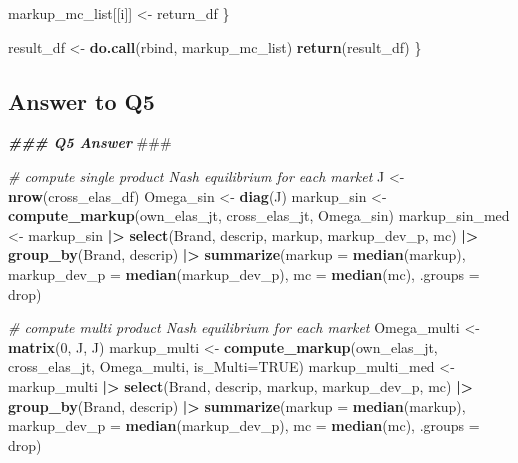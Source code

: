 \documentclass[
]{article}
\newenvironment{Shaded}{\begin{snugshade}}{\end{snugshade}}
\newcommand{\AlertTok}[1]{\textcolor[rgb]{0.94,0.16,0.16}{#1}}
\newcommand{\AttributeTok}[1]{\textcolor[rgb]{0.13,0.29,0.53}{#1}}
\newcommand{\CommentTok}[1]{\textcolor[rgb]{0.56,0.35,0.01}{\textit{#1}}}
\newcommand{\ConstantTok}[1]{\textcolor[rgb]{0.56,0.35,0.01}{#1}}
\newcommand{\DecValTok}[1]{\textcolor[rgb]{0.00,0.00,0.81}{#1}}
\newcommand{\DocumentationTok}[1]{\textcolor[rgb]{0.56,0.35,0.01}{\textbf{\textit{#1}}}}
\newcommand{\FunctionTok}[1]{\textcolor[rgb]{0.13,0.29,0.53}{\textbf{#1}}}
\newcommand{\NormalTok}[1]{#1}
\newcommand{\OtherTok}[1]{\textcolor[rgb]{0.56,0.35,0.01}{#1}}
\newcommand{\SpecialCharTok}[1]{\textcolor[rgb]{0.81,0.36,0.00}{\textbf{#1}}}
\newcommand{\StringTok}[1]{\textcolor[rgb]{0.31,0.60,0.02}{#1}}
\begin{document}
\begin{Shaded}
\begin{Highlighting}[]
\NormalTok{    markup\_mc\_list[[i]] }\OtherTok{\textless{}{-}}\NormalTok{ return\_df}
\NormalTok{  \}}
  
\NormalTok{  result\_df }\OtherTok{\textless{}{-}} \FunctionTok{do.call}\NormalTok{(rbind, markup\_mc\_list)}
  \FunctionTok{return}\NormalTok{(result\_df)}
\NormalTok{\} }
\end{Highlighting}
\end{Shaded}

\hypertarget{answer-to-q5}{%
\subsection{Answer to Q5}\label{answer-to-q5}}

\begin{Shaded}
\begin{Highlighting}[]
\DocumentationTok{\#\#\# Q5 Answer }\AlertTok{\#\#\#}

\CommentTok{\# compute single product Nash equilibrium for each market}
\NormalTok{J }\OtherTok{\textless{}{-}} \FunctionTok{nrow}\NormalTok{(cross\_elas\_df)}
\NormalTok{Omega\_sin }\OtherTok{\textless{}{-}} \FunctionTok{diag}\NormalTok{(J)}
\NormalTok{markup\_sin }\OtherTok{\textless{}{-}} \FunctionTok{compute\_markup}\NormalTok{(own\_elas\_jt, cross\_elas\_jt, Omega\_sin)}
\NormalTok{markup\_sin\_med }\OtherTok{\textless{}{-}}\NormalTok{ markup\_sin }\SpecialCharTok{|\textgreater{}}
  \FunctionTok{select}\NormalTok{(Brand, descrip, markup, markup\_dev\_p, mc) }\SpecialCharTok{|\textgreater{}}
  \FunctionTok{group\_by}\NormalTok{(Brand, descrip) }\SpecialCharTok{|\textgreater{}}
  \FunctionTok{summarize}\NormalTok{(}\AttributeTok{markup =} \FunctionTok{median}\NormalTok{(markup), }\AttributeTok{markup\_dev\_p =} \FunctionTok{median}\NormalTok{(markup\_dev\_p), }
            \AttributeTok{mc =} \FunctionTok{median}\NormalTok{(mc), }\AttributeTok{.groups =} \StringTok{\textquotesingle{}drop\textquotesingle{}}\NormalTok{)}

\CommentTok{\# compute multi product Nash equilibrium for each market}
\NormalTok{Omega\_multi }\OtherTok{\textless{}{-}} \FunctionTok{matrix}\NormalTok{(}\DecValTok{0}\NormalTok{, J, J)}
\NormalTok{markup\_multi }\OtherTok{\textless{}{-}} \FunctionTok{compute\_markup}\NormalTok{(own\_elas\_jt, cross\_elas\_jt, Omega\_multi, }\AttributeTok{is\_Multi=}\ConstantTok{TRUE}\NormalTok{)}
\NormalTok{markup\_multi\_med }\OtherTok{\textless{}{-}}\NormalTok{ markup\_multi }\SpecialCharTok{|\textgreater{}}
  \FunctionTok{select}\NormalTok{(Brand, descrip, markup, markup\_dev\_p, mc) }\SpecialCharTok{|\textgreater{}}
  \FunctionTok{group\_by}\NormalTok{(Brand, descrip) }\SpecialCharTok{|\textgreater{}}
  \FunctionTok{summarize}\NormalTok{(}\AttributeTok{markup =} \FunctionTok{median}\NormalTok{(markup), }\AttributeTok{markup\_dev\_p =} \FunctionTok{median}\NormalTok{(markup\_dev\_p), }
            \AttributeTok{mc =} \FunctionTok{median}\NormalTok{(mc), }\AttributeTok{.groups =} \StringTok{\textquotesingle{}drop\textquotesingle{}}\NormalTok{)}


\end{Highlighting}
\end{Shaded}
\end{document}
